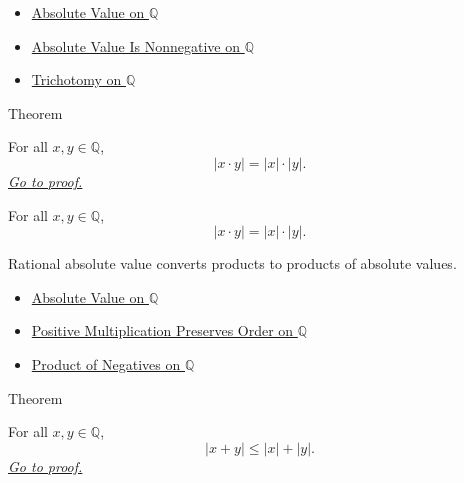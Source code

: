 \begin{dependencies}
\begin{itemize}
  \item \hyperref[def:absolute-value-on-q]{Absolute Value on $\mathbb{Q}$}
  \item \hyperref[thm:absolute-value-nonnegative-on-q]{Absolute Value Is Nonnegative on $\mathbb{Q}$}
  \item \hyperref[thm:trichotomy-on-q]{Trichotomy on $\mathbb{Q}$}
\end{itemize}
\end{dependencies}

\begin{theorembox}{Theorem}
\begin{theorem}
\label{thm:absolute-value-multiplicative-on-q}
For all $x,y\in\mathbb{Q}$,
\[
|x\cdot y|=|x|\cdot |y|.
\]
\hyperref[prf:absolute-value-multiplicative-on-q]{\textit{Go to proof.}}
\end{theorem}
\end{theorembox}

\begin{remark*}
For all $x,y\in\mathbb{Q}$,
\[
|x\cdot y|=|x|\cdot |y|.
\]
\end{remark*}

\begin{remark*}[Interpretation]
Rational absolute value converts products to products of absolute values.
\end{remark*}

\begin{dependencies}
\begin{itemize}
  \item \hyperref[def:absolute-value-on-q]{Absolute Value on $\mathbb{Q}$}
  \item \hyperref[thm:positive-multiplication-preserves-order-on-q]{Positive Multiplication
 Preserves Order on $\mathbb{Q}$}
  \item \hyperref[cor:product-of-negatives-on-q]{Product of Negatives on $\mathbb{Q}$}
\end{itemize}
\end{dependencies}

\begin{theorembox}{Theorem}
\begin{theorem}
\label{thm:triangle-inequality-on-q}
For all $x,y\in\mathbb{Q}$,
\[
|x+y|\le |x|+|y|.
\]
\hyperref[prf:triangle-inequality-on-q]{\textit{Go to proof.}}
\end{theorem}
\end{theorembox}

